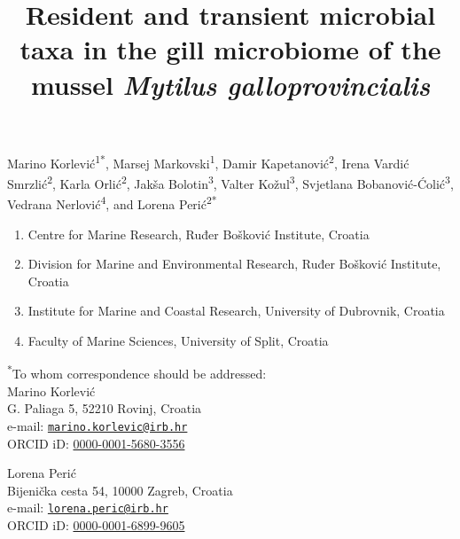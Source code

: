 \documentclass[
  12 pt,
]{article}
\title{\textbf{Resident and transient microbial taxa in the gill microbiome of the mussel \emph{Mytilus galloprovincialis}}}
\author{}
\date{\vspace{-2.5em}}
\providecommand{\tightlist}{%
  \setlength{\itemsep}{0pt}\setlength{\parskip}{0pt}}
\begin{document}
\maketitle


\renewcommand{\figurename}{Fig.}
\renewcommand{\thefigure}{\arabic{figure}}


\vspace{\fill}

Marino Korlević\textsuperscript{1*}, Marsej Markovski\textsuperscript{1}, Damir Kapetanović\textsuperscript{2}, Irena Vardić Smrzlić\textsuperscript{2}, Karla Orlić\textsuperscript{2}, Jakša Bolotin\textsuperscript{3}, Valter Kožul\textsuperscript{3}, Svjetlana Bobanović-Ćolić\textsuperscript{3}, Vedrana Nerlović\textsuperscript{4}, and Lorena Perić\textsuperscript{2*}

\begin{enumerate}
\def\labelenumi{\arabic{enumi}.}
\tightlist
\item
  Centre for Marine Research, Ruđer Bošković Institute, Croatia
\item
  Division for Marine and Environmental Research, Ruđer Bošković Institute, Croatia
\item
  Institute for Marine and Coastal Research, University of Dubrovnik, Croatia
\item
  Faculty of Marine Sciences, University of Split, Croatia
\end{enumerate}

\textsuperscript{*}To whom correspondence should be addressed:\\
Marino Korlević\\
G. Paliaga 5, 52210 Rovinj, Croatia\\
e-mail: \href{mailto:marino.korlevic@irb.hr}{\nolinkurl{marino.korlevic@irb.hr}}\\
ORCID iD: \href{https://orcid.org/0000-0001-5680-3556}{0000-0001-5680-3556}

Lorena Perić\\
Bijenička cesta 54, 10000 Zagreb, Croatia\\
e-mail: \href{mailto:lorena.peric@irb.hr}{\nolinkurl{lorena.peric@irb.hr}}\\
ORCID iD: \href{https://orcid.org/0000-0001-6899-9605}{0000-0001-6899-9605}
\end{document}
